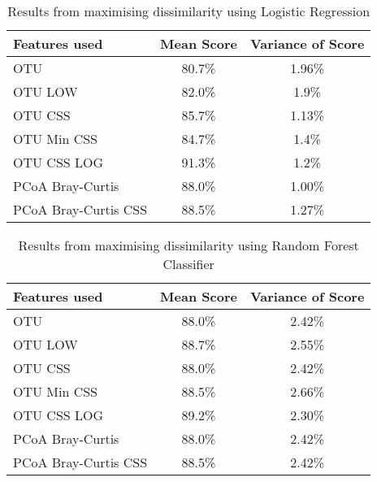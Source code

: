 \begin{table}[h]
\caption{Results from maximising dissimilarity using Logistic Regression}
\centering
\label{table:lrdissimilarity}
\begin{tabular}{l c  c}
\hline 
Features used & Mean Score & Variance of Score \\ 
 
\hline
OTU & 80.7\% & 1.96\%   \\
OTU LOW &82.0\%&1.9\%\\
OTU CSS & 85.7\% & 1.13\%   \\
OTU Min CSS & 84.7\% & 1.4\%   \\
OTU CSS LOG& 91.3\% &1.2\%\\
PCoA Bray-Curtis &88.0\% & 1.00\%   \\
PCoA Bray-Curtis CSS &88.5\% & 1.27\%   \\

\hline 
\end{tabular}
\end{table} 


\begin{table}[h]
	\caption{Results from maximising dissimilarity using Random Forest Classifier}
	\centering
	\label{table:rfrdissimilarity}
	\begin{tabular}{l c  c}
		\hline 
		Features used & Mean Score & Variance of Score \\ 
		
		\hline
		OTU & 88.0\% & 2.42\%   \\
		OTU LOW &88.7\%&2.55\%\\
		OTU CSS & 88.0\% & 2.42\%   \\
		OTU Min CSS & 88.5\% & 2.66\%   \\
		OTU CSS LOG & 89.2\%&	2.30\%\\
		PCoA Bray-Curtis &88.0\% & 2.42\%   \\
		PCoA Bray-Curtis CSS &88.5\% & 2.42\%   \\
		
		\hline 
	\end{tabular}
\end{table} 
